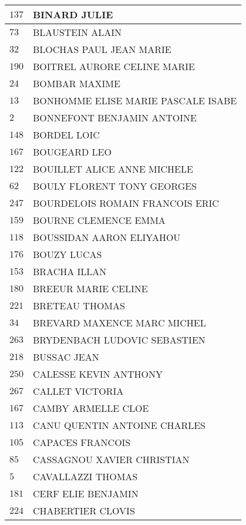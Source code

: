 \begin{xltabular}{\linewidth}{|l|X|}
    \hline
    $137$ & BINARD JULIE \\
    \hline
    $73$ & BLAUSTEIN ALAIN \\
    \hline
    $32$ & BLOCHAS PAUL JEAN MARIE \\
    \hline
    $190$ & BOITREL AURORE CELINE MARIE \\
    \hline
    $24$ & BOMBAR MAXIME \\
    \hline
    $13$ & BONHOMME ELISE MARIE PASCALE ISABE \\
    \hline
    $2$ & BONNEFONT BENJAMIN ANTOINE \\
    \hline
    $148$ & BORDEL LOIC \\
    \hline
    $167$ & BOUGEARD LEO \\
    \hline
    $122$ & BOUILLET ALICE ANNE MICHELE \\
    \hline
    $62$ & BOULY FLORENT TONY GEORGES \\
    \hline
    $247$ & BOURDELOIS ROMAIN FRANCOIS ERIC \\
    \hline
    $159$ & BOURNE CLEMENCE EMMA \\
    \hline
    $118$ & BOUSSIDAN AARON ELIYAHOU \\
    \hline
    $176$ & BOUZY LUCAS \\
    \hline
    $153$ & BRACHA ILLAN \\
    \hline
    $180$ & BREEUR MARIE CELINE \\
    \hline
    $221$ & BRETEAU THOMAS \\
    \hline
    $34$ & BREVARD MAXENCE MARC MICHEL \\
    \hline
    $263$ & BRYDENBACH LUDOVIC SEBASTIEN \\
    \hline
    $218$ & BUSSAC JEAN \\
    \hline
    $250$ & CALESSE KEVIN ANTHONY \\
    \hline
    $267$ & CALLET VICTORIA \\
    \hline
    $167$ & CAMBY ARMELLE CLOE \\
    \hline
    $113$ & CANU QUENTIN ANTOINE CHARLES \\
    \hline
    $105$ & CAPACES FRANCOIS \\
    \hline
    $85$ & CASSAGNOU XAVIER CHRISTIAN \\
    \hline
    $5$ & CAVALLAZZI THOMAS \\
    \hline
    $181$ & CERF ELIE BENJAMIN \\
    \hline
    $224$ & CHABERTIER CLOVIS \\
    \hline

\end{xltabular}
